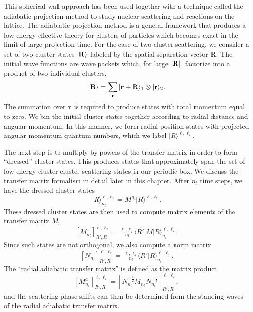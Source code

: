 This spherical wall approach has been used together with a technique called the adiabatic projection method to study nuclear scattering and reactions on the lattice.  The adiabiatic projection method \cite{Pine:2013zja,Elhatisari:2014lka,Elhatisari:2015iga,Rokash:2015hra,Elhatisari:2016owd} is a general framework that produces a low-energy effective theory for
clusters of particles which becomes exact in the limit of large projection
time.
For the case of two-cluster scattering, we consider a set of two cluster states
$|{\bf R}\rangle$ labeled by the spatial separation vector {\bf R}. The initial
wave
functions are wave packets which, for large $|{\bf R}|$, factorize into a
product of two
individual clusters,
%
\begin{equation}
|{\bf R}\rangle=\sum_{{\bf r}} |{\bf r}+{\bf R}\rangle_1\otimes|{\bf r}\rangle_2.
\label{eqn:single_clusters}
\end{equation}
%
The summation over $\bf {r}$ is required to produce states with 
total momentum equal to zero. We bin the initial cluster states together
according to radial distance and angular momentum. In this manner, we form
radial 
position states with projected angular momentum quantum numbers, which we
label $|R\rangle^{\ell,\ell_z}$. 

The next step is to multiply by powers of the transfer matrix in order to
form ``dressed'' cluster
states. This produces states that approximately span the set of low-energy cluster-cluster scattering
states in our periodic box. We discuss the transfer matrix formalism in detail later in this chapter. After $n_t$ time steps, we have the dressed cluster
states 
%
\begin{equation}
\vert R\rangle^{\ell,\ell_z}_{n_t} = M^{n_t}|R\rangle^{\ell,\ell_z}.
\end{equation}
%
These dressed cluster states are then used to compute matrix
elements of the transfer matrix $M$,
%
\begin{equation}
\left[M_{n_t}\right]^{\ell,\ell_z}_{R',R} =\ ^{\ell,\ell_z}_{\!\!\!\!\!\quad{n_t}}\langle
R'\vert M \vert R\rangle^{\ell,\ell_z}_{n_t}.
\label{Hmatrix}
\end{equation}
%
Since such states are not orthogonal, we also compute a norm
matrix
% 
\begin{equation}
\left[N_{n_t}\right]^{\ell,\ell_z}_{R',R} =\ ^{\ell,\ell_z}_{\!\!\!\!\!\quad{n_t}}\langle
R'\vert R\rangle^{\ell,\ell_z}_{n_t}. 
\label{eqn:norm}
\end{equation}
%
The ``radial adiabatic transfer matrix'' is defined as the matrix product
%
\begin{equation}
\left[ {M^a_{n_t}} \right]^{\ell,\ell_z}_{R',R} = 
\left[N_{n_t}^{-\frac{1}{2}}M_{n_t}
N_{n_t}^{-\frac{1}{2}} \right]^{\ell,\ell_z}_{R',R},
\label{eqn:Adiabatic-Hamiltonian}
\end{equation}
%
and the scattering phase shifts can then be determined from the standing waves
of the radial adiabatic transfer matrix.  

